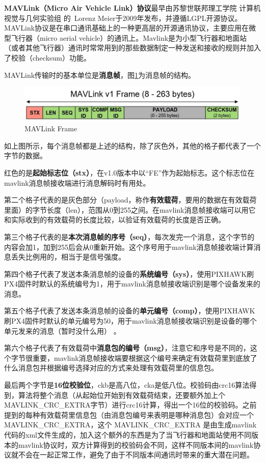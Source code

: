 \textbf{MAVLink（Micro Air Vehicle Link）协议}最早由苏黎世联邦理工学院 计算机视觉与几何实验组 的 Lorenz Meier于2009年发布，并遵循LGPL开源协议。MAVLink协议是在串口通讯基础上的一种更高层的开源通讯协议，主要应用在微型飞行器（micro aerial vehicle）的通讯上。Mavlink是为小型飞行器和地面站（或者其他飞行器）通讯时常常用到的那些数据制定一种发送和接收的规则并加入了校验（checksum）功能\cite{ArtE4}。

MAVLink传输时的基本单位是\textbf{消息帧}，图\ref{Fig:img7}为消息帧的结构。

\begin{figure}[ht]
  \centering
  \includegraphics[width=0.8\linewidth]{./Figure/Mavlink_Frame.jpg}
  \caption{MAVLink Frame}\label{Fig:img7}
\end{figure}

如上图所示，每个消息帧都是上述的结构，除了灰色外，其他的格子都代表了一个字节的数据。

红色的是\textbf{起始标志位（stx）}，在v1.0版本中以“FE”作为起始标志。这个标志位在mavlink消息帧接收端进行消息解码时有用处。

第二个格子代表的是灰色部分（payload，称作\textbf{有效载荷}，要用的数据在有效载荷里面）的字节长度（len），范围从0到255之间。在mavlink消息帧接收端可以用它和实际收到的有效载荷的长度比较，以验证有效载荷的长度是否正确。

第三个格子代表的是\textbf{本次消息帧的序号（seq）}，每次发完一个消息，这个字节的内容会加1，加到255后会从0重新开始。这个序号用于mavlink消息帧接收端计算消息丢失比例用的，相当于是信号强度。

第四个格子代表了发送本条消息帧的设备的\textbf{系统编号（sys）}，使用PIXHAWK刷PX4固件时默认的系统编号为1，用于mavlink消息帧接收端识别是哪个设备发来的消息。

第五个格子代表了发送本条消息帧的设备的\textbf{单元编号（comp）}，使用PIXHAWK刷PX4固件时默认的单元编号为50，用于mavlink消息帧接收端识别是设备的哪个单元发来的消息（暂时没什么用） 。

第六个格子代表了有效载荷中\textbf{消息包的编号（msg）}，注意它和序号是不同的，这个字节很重要，mavlink消息帧接收端要根据这个编号来确定有效载荷里到底放了什么消息包并根据编号选择对应的方式来处理有效载荷里的信息包。

最后两个字节是\textbf{16位校验位}，ckb是高八位，cka是低八位。校验码由crc16算法得到，算法将整个消息（从起始位开始到有效载荷结束，还要额外加上个MAVLINK\_CRC\_EXTRA字节）进行crc16计算，得出一个16位的校验码。之前提到的每种有效载荷里信息包（由消息包编号来表明是哪种消息包）会对应一个MAVLINK\_CRC\_EXTRA，这个 MAVLINK\_CRC\_EXTRA 是由生成mavlink代码的xml文件生成的，加入这个额外的东西是为了当飞行器和地面站使用不同版本的mavlink协议时，双方计算得到的校验码会不同，这样不同版本间的mavlink协议就不会在一起正常工作，避免了由于不同版本间通讯时带来的重大潜在问题。

